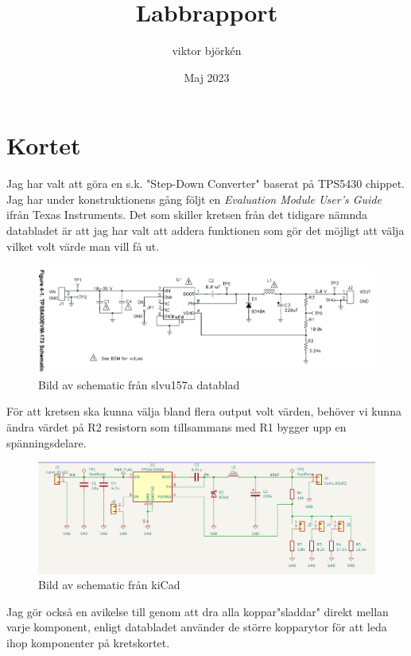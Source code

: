 \documentclass{article}
\title{Labbrapport}
\author{viktor björkén }
\date{Maj 2023}
\begin{document}
\maketitle

\section{Kortet}

Jag har valt att göra en s.k. "Step-Down Converter" baserat på TPS5430 chippet.
Jag har under konstruktionens gång följt en \textit{Evaluation Module User's
Guide} ifrån Texas Instruments. Det som skiller kretsen från det tidigare
nämnda databladet är att jag har valt att addera funktionen som gör det möjligt
att välja vilket volt värde man vill få ut. 

\begin{figure}[htp]
    \centering
    \includegraphics[width=15cm]{img/nyschema.png}
    \caption{Bild av schematic från slvu157a datablad}
\end{figure}

För att kretsen ska kunna välja bland flera output volt värden, behöver vi
kunna ändra värdet på R2 resistorn som tillsammans med R1 bygger upp en
spänningsdelare.

\begin{figure}[htp]
    \centering
    \includegraphics[width=15cm]{img/schemalab.png}
    \caption{Bild av schematic från kiCad}
\end{figure}

Jag gör också en avikelse till genom att dra alla koppar"sladdar" direkt mellan
varje komponent, enligt databladet använder de större kopparytor för att leda
ihop komponenter på kretskortet. 
\end{document}
